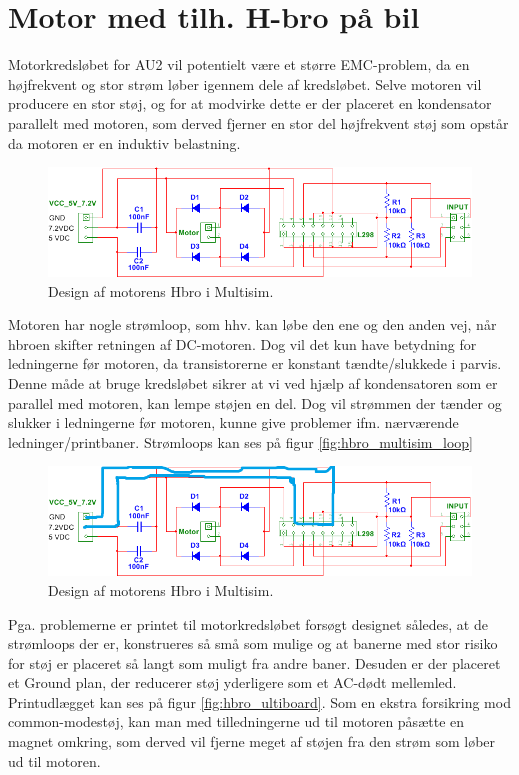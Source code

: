 \section{Motor med tilh. H-bro på bil}

Motorkredsløbet for AU2 vil potentielt være et større EMC-problem, da en højfrekvent og stor strøm løber igennem dele af kredsløbet. Selve motoren vil producere en stor støj, og for at modvirke dette er der placeret en kondensator parallelt med motoren, som derved fjerner en stor del højfrekvent støj som opstår da motoren er en induktiv belastning. 

\begin{figure}[h]
\centering
\includegraphics[width=\textwidth]{../fig/billeder/hbro_multisim.png}
\caption{Design af motorens Hbro i Multisim.}
\label{fig:hbro_multisim}
\end{figure}

Motoren har nogle strømloop, som hhv. kan løbe den ene og den anden vej, når hbroen skifter retningen af DC-motoren. Dog vil det kun have betydning for ledningerne før motoren, da transistorerne er konstant tændte/slukkede i parvis. Denne måde at bruge kredsløbet sikrer at vi ved hjælp af kondensatoren som er parallel med motoren, kan lempe støjen en del. Dog vil strømmen der tænder og slukker i ledningerne før motoren, kunne give problemer ifm. nærværende ledninger/printbaner. 
Strømloops kan ses på figur \ref{fig:hbro_multisim_loop}

\begin{figure}[h]
\centering
\includegraphics[width=\textwidth]{../fig/billeder/hbro_multisim_loop.png}
\caption{Design af motorens Hbro i Multisim.}
\label{fig:hbro_multisim}
\end{figure}

Pga. problemerne er printet til motorkredsløbet forsøgt designet således, at de strømloops der er, konstrueres så små som mulige og at banerne med stor risiko for støj er placeret så langt som muligt fra andre baner. Desuden er der placeret et Ground plan, der reducerer støj yderligere som et AC-dødt mellemled. Printudlægget kan ses på figur \ref{fig:hbro_ultiboard}.
Som en ekstra forsikring mod common-modestøj, kan man med tilledningerne ud til motoren påsætte en magnet omkring, som derved vil fjerne meget af støjen fra den strøm som løber ud til motoren.

